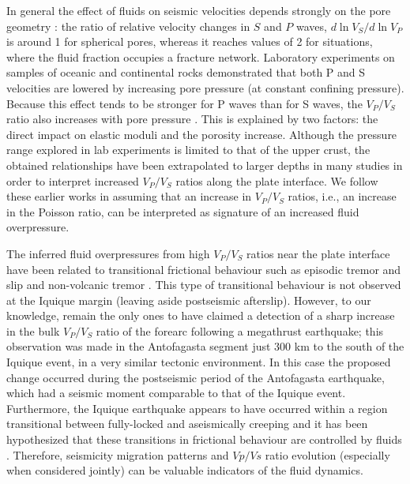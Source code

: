 \documentclass[11pt]{article}
\begin{document}
\begin{description}
 In general the effect of fluids on seismic velocities depends strongly on the pore geometry \citep{takei02}: the ratio of relative velocity changes in $S$ and $P$ waves, ${d\ln V_S}/{d\ln V_P}$ is around 1 for spherical pores, whereas it reaches 
 values of 2 for situations, where the fluid fraction occupies a fracture network. Laboratory experiments on samples of oceanic and continental rocks demonstrated that both P and S velocities are lowered by increasing pore pressure (at constant confining pressure). Because this effect tends to be stronger for P waves than for S waves, the $V_P/V_S$ ratio also increases with pore pressure \citep{christensen84,peacock11}.
 This is explained by two factors: the direct impact on elastic moduli and the porosity increase.
 Although the pressure range explored in lab experiments is limited to that of the upper crust, %
 the obtained relationships have been extrapolated to larger depths in many studies \citep[e.g.][]{kato10,kodaira04} in order to interpret increased $V_P/V_S$ ratios along the plate interface.  We follow these earlier works in assuming that an increase in $V_P/V_S$ ratios, i.e., an increase in the Poisson ratio, can be interpreted as signature of an increased fluid overpressure.
 
 The inferred fluid overpressures from high $V_P/V_S$ ratios near the plate interface have been related  to transitional frictional behaviour such as episodic tremor and slip and non-volcanic tremor \citep{kodaira04}.  This type of transitional behaviour is not observed at the Iquique margin (leaving aside postseismic afterslip).%
 However, to our knowledge, \citet{husen01_geology} remain the only ones to have claimed a detection of a sharp increase in the bulk $V_P/V_S$ ratio of the forearc following a megathrust earthquake; this observation was made in the Antofagasta segment just 300 km to the south of the Iquique event, in a very similar tectonic environment.  In this case the proposed change occurred during the postseismic period of the Antofagasta earthquake, which had a seismic moment comparable to that of the Iquique event.   Furthermore, the Iquique earthquake appears to have occurred within a region transitional between fully-locked and aseismically creeping \citep{schurr2014} and it has been hypothesized that these transitions in frictional behaviour are controlled by fluids \citep{moreno14}.
  Therefore, seismicity migration patterns and $Vp/Vs$ ratio evolution (especially when considered jointly) can be valuable indicators of the fluid dynamics.
  

\end{description}
\end{document}
